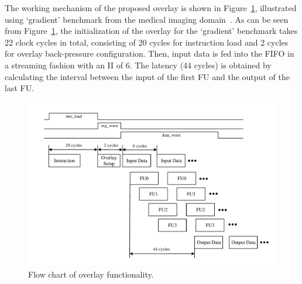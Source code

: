 The working mechanism of the proposed overlay is shown in Figure~\ref{flow_chart}, illustrated using `gradient' benchmark from the medical imaging domain~\cite{cong2014fully}. 
As can be seen from Figure~\ref{flow_chart}, the initialization of the overlay for the `gradient' benchmark takes 22 clock cycles in total, consisting of 20 cycles for instruction load and 2 cycles for overlay back-pressure configuration. 
Then, input data is fed into the FIFO in a streaming fashion with an II of 6. 
The latency (44 cycles) is obtained by calculating the interval between the input of the first FU and the output of the last FU. 

\begin{figure}
	\centering
	\includegraphics[width=0.9\linewidth]{Figures/flow_chart.pdf}
	\caption{Flow chart of overlay functionality.}
	\label{flow_chart}
\end{figure}
